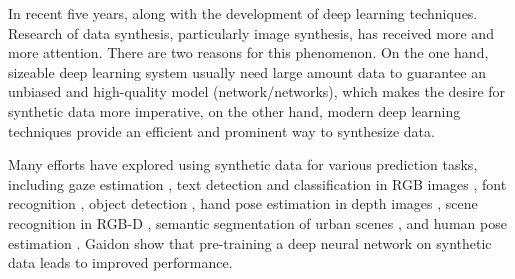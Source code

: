\documentclass{iitthesis}
\begin{document}
In recent five years, along with the development of deep learning techniques. Research of data synthesis, particularly image synthesis, has received more and more attention. There are two reasons for this phenomenon. On the one hand, sizeable deep learning system usually need large amount data to guarantee an unbiased and high-quality model (network/networks), which makes the desire for synthetic data more imperative, on the other hand, modern deep learning techniques provide an efficient and prominent way to synthesize data. 

Many efforts have explored using synthetic data for various prediction tasks, including gaze estimation \cite{wood2016learning}, text detection and classification in RGB images \cite{gupta2016synthetic}, font recognition \cite{wang2015deepfont}, object detection \cite{gupta2014learning}, hand pose estimation in depth images \cite{tompson2014real}\cite{supancic2015depth}, scene recognition in RGB-D , semantic segmentation of urban scenes \cite{ros2016synthia}, and human pose estimation 
\cite{park2015articulated}\cite{shakhnarovich2003fast}\cite{lecun2004learning}\cite{ionescu2014human3}\cite{pishchulin2012articulated}\cite{rogez2016mocap}.  Gaidon \cite{gaidon2016virtual} show that pre-training a deep neural network on synthetic data leads to improved performance.
\end{document}
